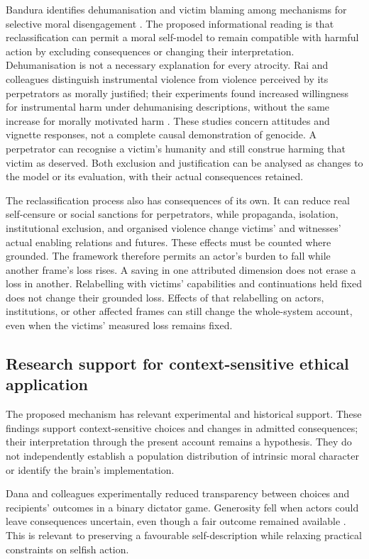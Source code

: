 \documentclass[11pt,a4paper]{article}
\theoremstyle{remark}
\begin{document}
Bandura identifies dehumanisation and victim blaming among mechanisms for
selective moral disengagement \citep{bandura2002disengagement}. The proposed
informational reading is that reclassification can permit a moral self-model to
remain compatible with harmful action by excluding consequences or changing
their interpretation. Dehumanisation is not a necessary explanation for every
atrocity. Rai and colleagues distinguish instrumental violence from violence
perceived by its perpetrators as morally justified; their experiments found
increased willingness for instrumental harm under dehumanising descriptions,
without the same increase for morally motivated harm
\citep{rai2017dehumanization}. These studies concern attitudes and vignette
responses, not a complete causal demonstration of genocide. A perpetrator can
recognise a victim's humanity and still construe harming that victim as deserved.
Both exclusion and justification can be analysed as changes to the model or its
evaluation, with their actual consequences retained.

The reclassification process also has consequences of its own. It can reduce
real self-censure or social sanctions for perpetrators, while propaganda,
isolation, institutional exclusion, and organised violence change victims' and
witnesses' actual enabling relations and futures. These effects must be counted
where grounded. The framework therefore permits an actor's burden to fall while
another frame's loss rises. A saving in one attributed dimension does not erase
a loss in another. Relabelling with victims' capabilities and continuations
held fixed does not change their grounded loss. Effects of that relabelling on
actors, institutions, or other affected frames can still change the whole-system
account, even when the victims' measured loss remains fixed.

\subsection{Research support for context-sensitive ethical application}

The proposed mechanism has relevant experimental and historical support.
These findings support context-sensitive choices and changes in admitted
consequences; their interpretation through the present account remains a
hypothesis. They do not independently establish a population distribution of
intrinsic moral character or identify the brain's implementation.

Dana and colleagues experimentally reduced transparency between choices and
recipients' outcomes in a binary dictator game. Generosity fell when actors
could leave consequences uncertain, even though a fair outcome remained
available \citep{dana2007wiggle}. This is relevant to preserving a favourable
self-description while relaxing practical constraints on selfish action.
\end{document}
